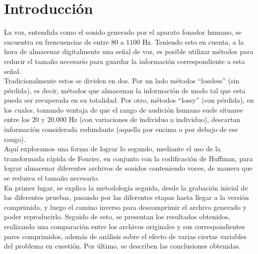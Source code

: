 \documentclass[a4paper,11pt]{article}
\begin{document}
\section{Introducci\'on}

La voz, entendida como el sonido generado por el aparato fonador humano, se
encuentra en frencuencias de entre $80$ a $1100$ Hz.  Teniendo esto en cuenta,
a la hora de almacenar digitalmente una señal de voz, es posible utilizar
métodos para reducir el tamaño necesario para guardar la información
correspondiente a esta señal.\\
Tradicionalmente estos se dividen en dos. Por un lado métodos ``lossless'' (sin
pérdida), es decir, métodos que almacenan la información de modo tal que esta
pueda ser recuperada en su totalidad. Por otro, métodos ``lossy'' (con pérdida),
en los cuales, tomando ventaja de que el rango de audición humano suele
situarse entre los $20$ y $20.000$ Hz (con variaciones de individuo a
individuo), descartan información considerada redundante (aquella por encima o
por debajo de ese rango).\\
Aquí exploramos una forma de lograr lo segundo, mediante el uso de la
transformada rápida de Fourier, en conjunto con la codificación de Huffman,
para lograr almacenar diferentes archivos de sonidos conteniendo voces, de
manera que se reduzca el tamaño necesario.\\
En primer lugar, se explica la metodología seguida, desde la grabación
inicial de las diferentes pruebas, pasando por las diferentes etapas hasta
llegar a la versión comprimida, y luego el camino inverso para descomprimir el
archivo generado y poder reproducirlo.
Seguido de esto, se presentan los resultados obtenidos, realizando una
comparación entre los archivos originales y sus correspondientes pares
comprimidos, además de análisis sobre el efecto de varias ciertas variables del
problema en cuestión.
Por último, se describen las conclusiones obtenidas.

\end{document}

